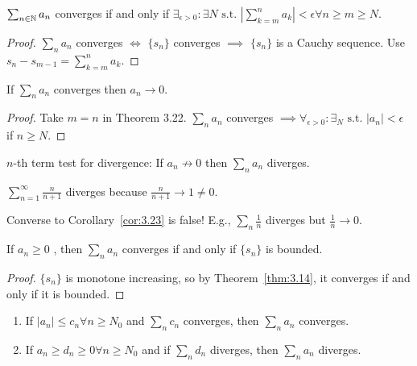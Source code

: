 \begin{theorem}
	$\sum_{n \in \mathbb{N}}{a_{n}}$ converges if and only if $\exists_{\epsilon >0}: \exists N \text{ s.t. } |\sum_{k=m}^{n}{a_{k}}| <\epsilon \forall{n\ge m\ge  N}$.
	\begin{proof}
		$\sum_{n}{a_{n}}$ converges $\Leftrightarrow $ $\{ {s}_{n}\}$ converges $\implies  $ $\{ {s}_{n}\}$ is a Cauchy sequence. Use $s_{n}-s_{m-1}=\sum_{k=m}^{n}{a_k}$.
	\end{proof}
\end{theorem}
\begin{corollary}
	\label{cor:3.23}
	If $\sum_{n}{a_{n}}$ converges then $a_{n}\to 0$.
	\begin{proof}
		Take $m=n$ in Theorem 3.22. $\sum_{n}{a_{n}}$ converges $\implies \forall_{\epsilon > 0}: \exists_{N} \text{ s.t. } |a_{n}| <\epsilon $ if $n\ge N$.
	\end{proof}
	\begin{remark}
		$n$-th term test for divergence: If $a_{n}\not\to 0$ then $\sum_n{a_{n}}$ diverges.
		\begin{example}
			$\sum_{n=1}^{\infty }{\frac{n}{n+1}}$ diverges because $\frac{n}{n+1}\to 1\neq 0$.
		\end{example}
		Converse to Corollary~\ref{cor:3.23} is false! E.g., $\sum_{n}{\frac{1}{n}}$ diverges but $\frac{1}{n}\to 0$.
	\end{remark}
\end{corollary}

\begin{theorem}
	\label{thm:3.24}
	If $a_{n}\ge 0$ , then $\sum_{n}{a_{n}}$ converges if and only if $\{ {s}_{n}\}$ is bounded.
	\begin{proof}
		$\{ {s}_{n}\}$ is monotone increasing, so by Theorem~\ref{thm:3.14}, it converges if and only if it is bounded.
	\end{proof}
\end{theorem}

\begin{theorem}
	\label{thm:3.25}
	\begin{enumerate}[label=(\alph*)]
		\item If $|a_{n}| \le c_n \forall n\ge N_0$ and $\sum_{n}{c_{n}}$ converges, then $\sum_{n}{a_{n}}$ converges.
		\item If $a_{n}\ge d_{n}\ge 0 \forall n\ge N_0$ and if $\sum_{n}{d_n}$ diverges, then $\sum_{n}{a_{n}}$ diverges.
	\end{enumerate}
\end{theorem}






